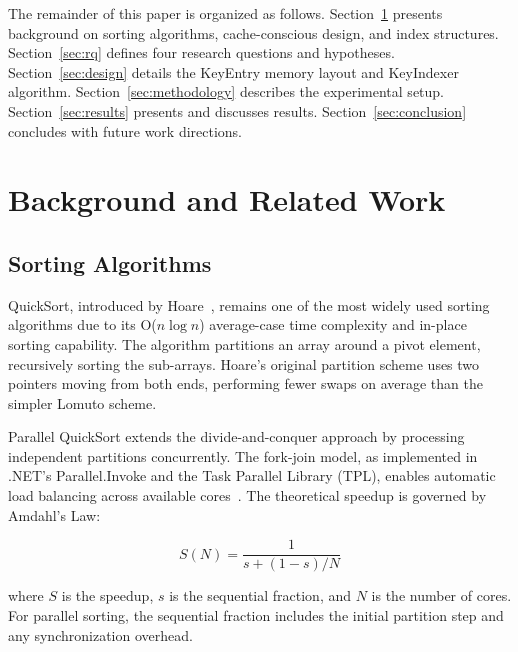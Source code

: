 \documentclass[conference]{IEEEtran}
\begin{document}
The remainder of this paper is organized as follows. Section~\ref{sec:background} presents background on sorting algorithms, cache-conscious design, and index structures. Section~\ref{sec:rq} defines four research questions and hypotheses. Section~\ref{sec:design} details the KeyEntry memory layout and KeyIndexer algorithm. Section~\ref{sec:methodology} describes the experimental setup. Section~\ref{sec:results} presents and discusses results. Section~\ref{sec:conclusion} concludes with future work directions.

\section{Background and Related Work}
\label{sec:background}

\subsection{Sorting Algorithms}
\label{sec:sorting_algorithms}

QuickSort, introduced by Hoare~\cite{hoare1962quicksort}, remains one of the most widely used sorting algorithms due to its O($n \log n$) average-case time complexity and in-place sorting capability. The algorithm partitions an array around a pivot element, recursively sorting the sub-arrays. Hoare's original partition scheme uses two pointers moving from both ends, performing fewer swaps on average than the simpler Lomuto scheme.

Parallel QuickSort extends the divide-and-conquer approach by processing independent partitions concurrently. The fork-join model, as implemented in .NET's Parallel.Invoke and the Task Parallel Library (TPL), enables automatic load balancing across available cores~\cite{sanders2009fast}. The theoretical speedup is governed by Amdahl's Law:

\begin{equation}
S(N) = \frac{1}{s + (1-s)/N}
\label{eq:amdahl}
\end{equation}

where $S$ is the speedup, $s$ is the sequential fraction, and $N$ is the number of cores. For parallel sorting, the sequential fraction includes the initial partition step and any synchronization overhead.
\end{document}
